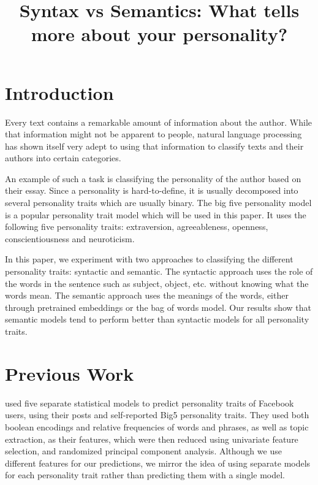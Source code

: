 \documentclass[10pt, a4paper]{article}
\title{Syntax vs Semantics: What tells more about your personality?}
\begin{document}
\maketitleabstract

\section{Introduction}

Every text contains a remarkable amount of information about the author.
While that information might not be apparent to people, natural language processing has shown itself very adept to using that information to classify texts and their authors into certain categories.

An example of such a task is classifying the personality of the author based on their essay.
Since a personality is hard-to-define, it is usually decomposed into several personality traits which are usually binary.
The big five personality model is a popular personality trait model which will be used in this paper.
It uses the following five personality traits: extraversion, agreeableness, openness, conscientiousness and neuroticism.

In this paper, we experiment with two approaches to classifying the different personality traits: syntactic and semantic.
The syntactic approach uses the role of the words in the sentence such as subject, object, etc. without knowing what the words mean.
The semantic approach uses the meanings of the words, either through pretrained embeddings or the bag of words model.
Our results show that semantic models tend to perform better than syntactic models for all personality traits.

\section{Previous Work}

\cite{park} used five separate statistical models to predict personality traits of Facebook users, using their posts and self-reported Big5 personality traits.
They used both boolean encodings and relative frequencies of words and phrases, as well as topic extraction, as their features, which were then reduced using univariate feature selection, and randomized principal component analysis.
Although we use different features for our predictions, we mirror the idea of using separate models for each personality trait rather than predicting them with a single model.
\end{document}
